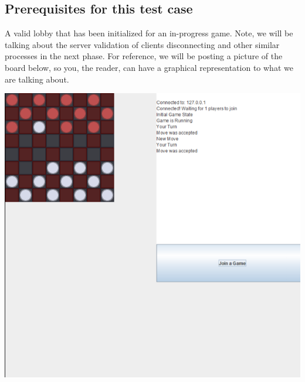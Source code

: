 \documentclass{scrreprt}
\begin{document}
\subsection{Prerequisites for this test case}
A valid lobby that has been initialized for an in-progress game. Note, we will be talking about the server validation of clients disconnecting and other similar processes in the next phase. For reference, we will be posting a picture of the board below, so you, the reader, can have a graphical representation to what we are talking about.

\includegraphics[scale=0.7]{board.png}
\end{document}
